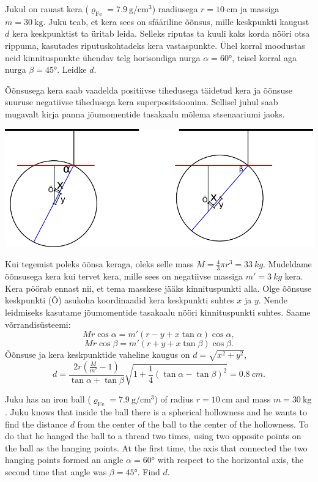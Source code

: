 
Jukul on rauast kera
($\varrho_\mathrm{Fe}=\SI{7,9}{\gram\per\centi\meter\cubed}$) raadiusega
$r=\SI{10}{\centi\meter}$ ja massiga $m=\SI{30}{\kilo\gram}$. Juku teab, et kera
sees on sfääriline õõnsus, mille keskpunkti kaugust $d$ kera keskpunktist ta üritab
leida. Selleks riputas ta kuuli kaks korda nööri otsa rippuma, kasutades
riputuskohtadeks kera vastaspunkte. Ühel korral moodustas neid kinnituspunkte
ühendav telg horisondiga nurga $\alpha=\ang{60}$, teisel korral aga nurga
$\beta=\ang{45}$. Leidke $d$.

\hint
Õõnsusega kera saab vaadelda positiivse tihedusega täidetud kera ja õõnsuse suuruse negatiivse tihedusega kera superpositsioonina. Sellisel juhul saab mugavalt kirja panna jõumomentide tasakaalu mõlema stsenaariumi jaoks.

\solu
\begin{center}
\includegraphics[width=\textwidth]{2013-v2g-09-kera.png}
\end{center}

Kui tegemist poleks õõnsa keraga, oleks selle mass $M=\frac{4}{3}\pi r^3 = \SI{33}{kg}$. Mudeldame õõnsusega kera kui tervet kera, mille sees on negatiivse massiga $m'=\SI{3}{kg}$ kera. Kera pöörab ennast nii, et tema masskese jääks kinnituspunkti alla. Olge õõnsuse keskpunkti (Õ) asukoha koordinaadid kera keskpunkti suhtes $x$ ja $y$. Nende leidmiseks kasutame jõumomentide tasakaalu nööri kinnituspunkti suhtes. Saame võrrandisüsteemi:
\[Mr \cos \alpha = m'(r-y+x \tan \alpha) \cos \alpha,\]
\[Mr \cos \beta = m'(r+y+x \tan \beta) \cos \beta.\]
Õõnsuse ja kera keskpunktide vaheline kaugus on $d=\sqrt{x^2+y^2}$,
\[ d=\frac{2r(\frac{M}{m'}-1)}{\tan\alpha+\tan\beta}\sqrt{1+\frac{1}{4}(\tan\alpha-\tan\beta)^2} = \SI{0,8}{cm}. \]

Juku has an iron ball ($\varrho_\mathrm{Fe}=\SI{7,9}{\gram\per\centi\meter\cubed}$) of radius $r=\SI{10}{\centi\meter}$ and mass $m=\SI{30}{\kilo\gram}$. Juku knows that inside the ball there is a spherical hollowness and he wants to find the distance $d$ from the center of the ball to the center of the hollowness. To do that he hanged the ball to a thread two times, using two opposite points on the ball as the hanging points. At the first time, the axis that connected the two hanging points formed an angle $\alpha=\ang{60}$ with respect to the horizontal axis, the second time that angle was $\beta=\ang{45}$. Find $d$.

